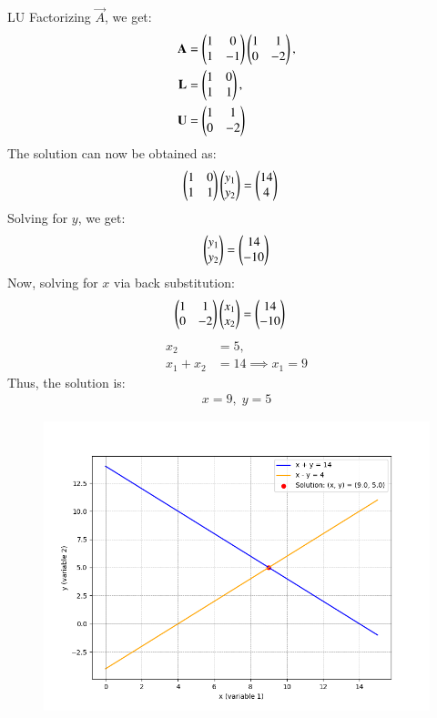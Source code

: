 \documentclass[journal]{IEEEtran}
\begin{document}
\begin{enumerate}
LU Factorizing \(\vec{A}\), we get:
\begin{align}
    \mathbf{A} &= \begin{pmatrix}1 & 0\\1 & -1\end{pmatrix}\begin{pmatrix}1 & 1\\0 & -2\end{pmatrix}, \\
    \mathbf{L} &= \begin{pmatrix}1 & 0\\1 & 1\end{pmatrix}, \\
    \mathbf{U} &= \begin{pmatrix}1 & 1\\0 & -2\end{pmatrix}
\end{align}
The solution can now be obtained as:
\begin{align}
    \begin{pmatrix}1 & 0\\1 & 1\end{pmatrix}\begin{pmatrix}y_1 \\ y_2\end{pmatrix} &= \begin{pmatrix}14 \\ 4\end{pmatrix}
\end{align}
Solving for \(y\), we get:
\begin{align}
    \begin{pmatrix}y_1 \\ y_2\end{pmatrix} = \begin{pmatrix}14 \\ -10\end{pmatrix}
\end{align}
Now, solving for \(x\) via back substitution:
\begin{align}
    \begin{pmatrix}1 & 1\\0 & -2\end{pmatrix}\begin{pmatrix}x_1 \\ x_2\end{pmatrix} &= \begin{pmatrix}14 \\ -10\end{pmatrix}
\end{align}
\begin{align}
    x_2 &= 5, \\
    x_1 + x_2 &= 14 \implies x_1 = 9
\end{align}
Thus, the solution is:
\begin{align}
    x = 9, \; y = 5
\end{align}
\begin{figure}[H]
    \centering
    \includegraphics[width=\columnwidth]{figs/fig.png}
\end{figure}
\end{enumerate}
\end{document}
